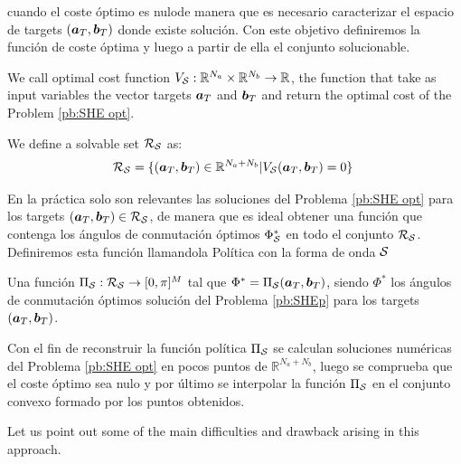 \documentclass[twocolumn]{autart}    %
\begin{document}
cuando el coste óptimo es nulode manera que es necesario caracterizar el  espacio de targets $(\bm{a}_T,\bm{b}_T) $ donde existe solución. Con este objetivo definiremos la función de coste óptima y luego a partir de ella el conjunto solucionable.
\vspace{1em}
\begin{definition}
	We call optimal cost function $V_{\mathcal{S}}:\mathbb{R}^{N_a}\times \mathbb{R}^{N_b} \rightarrow \mathbb{R}$, the function that take as input variables the vector targets $\bm{a}_T$ and $\bm{b}_T$ and return the optimal cost of the Problem \ref{pb:SHE opt}.
\end{definition}

\vspace{1em}
\begin{definition}
	We define a solvable set $\mathcal{R}_{\mathcal{S}}$ as:
	\begin{gather}
		\mathcal{R}_{\mathcal{S}} = \{ (\bm{a}_T,\bm{b}_T) \in \mathbb{R}^{N_a+N_b} | V_{\mathcal{S}}(\bm{a}_T,\bm{b}_T) = 0\}\
	\end{gather}
\end{definition}
En la práctica solo son relevantes las soluciones del Problema \ref{pb:SHE opt} para los targets $(\bm{a}_T,\bm{b}_T) \in \mathcal{R}_{\mathcal{S}}$, de manera que es ideal obtener una función que contenga  los ángulos de conmutación óptimos $\Phi^*_{\mathcal{S}}$ en todo el conjunto $\mathcal{R}_{\mathcal{S}}$. Definiremos  esta función llamandola Política con la forma de onda $\mathcal{S}$

\vspace{1em}
\begin{definition}
Una función $\Pi_{\mathcal{S}}: \mathcal{R}_{\mathcal{S}} \rightarrow [0,\pi]^M$ tal que $\Phi^* = \Pi_{\mathcal{S}}(\bm{a}_T,\bm{b}_T)$, siendo $\Phi^*$ los ángulos de conmutación óptimos solución del Problema \ref{pb:SHEp} para los targets $(\bm{a}_T,\bm{b}_T)$.
\end{definition} 

Con el fin de reconstruir la función política $\Pi_{\mathcal{S}}$ se calculan soluciones numéricas del Problema \ref{pb:SHE opt} en pocos puntos de $\mathbb{R}^{N_a+N_b}$, luego se comprueba que el coste óptimo sea nulo y por último se interpolar la función $\Pi_{\mathcal{S}}$ en el conjunto convexo formado por los puntos obtenidos. 

\JOEnd

Let us point out some of the main difficulties and drawback arising in this approach.
\end{document}
